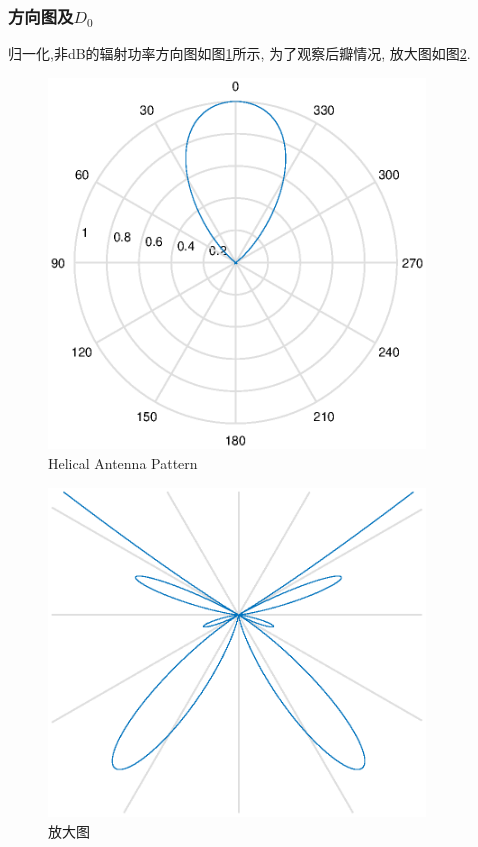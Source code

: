 \subsubsection{方向图及$D_0$}
归一化,非dB的辐射功率方向图如图\ref{fig:HelixP}所示, 为了观察后瓣情况, 放大图如图\ref{fig:HelixP_fangda}. 
\begin{figure}[!ht]
	\centering
	\includegraphics[width=10cm]{HelixPattern.eps}
	\caption{Helical Antenna Pattern} \label{fig:HelixP}
\end{figure}

\begin{figure}[!ht]
	\centering
	\includegraphics[width=10cm]{HelixPattern_fangda.eps}
	\caption{放大图} \label{fig:HelixP_fangda}
\end{figure}




